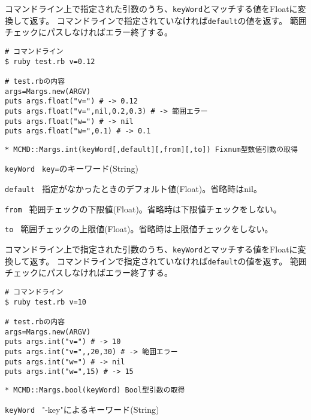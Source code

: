 コマンドライン上で指定された引数のうち、\verb/keyWord/とマッチする値をFloatに変換して返す。
コマンドラインで指定されていなければ\verb/default/の値を返す。
範囲チェックにパスしなければエラー終了する。

\begin{Verbatim}[baselinestretch=0.7,frame=single]
# コマンドライン
$ ruby test.rb v=0.12

# test.rbの内容
args=Margs.new(ARGV)
puts args.float("v=") # -> 0.12
puts args.float("v=",nil,0.2,0.3) # -> 範囲エラー
puts args.float("w=") # -> nil
puts args.float("w=",0.1) # -> 0.1
\end{Verbatim}

{\Large
\begin{verbatim}
* MCMD::Margs.int(keyWord[,default][,from][,to]) Fixnum型数値引数の取得
\end{verbatim}
}

\begin{description}
\item {\large \verb/keyWord /} \verb/key=/のキーワード(String)
\item {\large \verb/default /} 指定がなかったときのデフォルト値(Float)。省略時はnil。
\item {\large \verb/from /} 範囲チェックの下限値(Float)。省略時は下限値チェックをしない。
\item {\large \verb/to /} 範囲チェックの上限値(Float)。省略時は上限値チェックをしない。
\end{description}

コマンドライン上で指定された引数のうち、\verb/keyWord/とマッチする値をFloatに変換して返す。
コマンドラインで指定されていなければ\verb/default/の値を返す。
範囲チェックにパスしなければエラー終了する。

\begin{Verbatim}[baselinestretch=0.7,frame=single]
# コマンドライン
$ ruby test.rb v=10

# test.rbの内容
args=Margs.new(ARGV)
puts args.int("v=") # -> 10
puts args.int("v=",,20,30) # -> 範囲エラー
puts args.int("w=") # -> nil
puts args.int("w=",15) # -> 15
\end{Verbatim}

{\Large
\begin{verbatim}
* MCMD::Margs.bool(keyWord) Bool型引数の取得
\end{verbatim}
}

\begin{description}
\item {\large \verb/keyWord /} "-key"によるキーワード(String)
\end{description}

